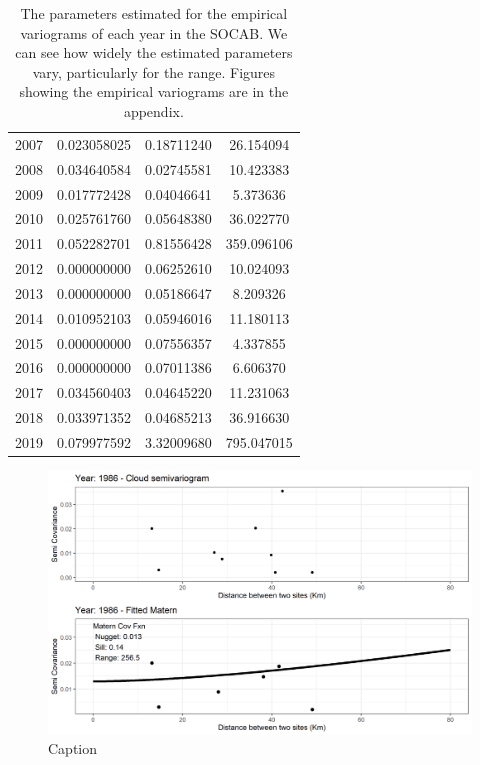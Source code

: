 \begin{table}[]
\begin{tabular}{c|c|c|c}
 2007 & 0.023058025 & 0.18711240  & 26.154094 \\
 2008 & 0.034640584 & 0.02745581  & 10.423383 \\
 2009 & 0.017772428 & 0.04046641  &  5.373636 \\
 2010 & 0.025761760 & 0.05648380  & 36.022770 \\
 2011 & 0.052282701 & 0.81556428 & 359.096106 \\
 2012 & 0.000000000 & 0.06252610  & 10.024093 \\
 2013 & 0.000000000 & 0.05186647  &  8.209326 \\
 2014 & 0.010952103 & 0.05946016  & 11.180113 \\
 2015 & 0.000000000 & 0.07556357  &  4.337855 \\
 2016 & 0.000000000 & 0.07011386  &  6.606370 \\
 2017 & 0.034560403 & 0.04645220  & 11.231063 \\
 2018 & 0.033971352 & 0.04685213  & 36.916630 \\
 2019 & 0.079977592 & 3.32009680 & 795.047015 \\
\end{tabular}
    \caption{The parameters estimated for the empirical variograms of each year in the SOCAB. We can see how widely the estimated parameters vary, particularly for the range. Figures showing the empirical variograms are in the appendix.}
    \label{tab:Emperical_Variogram_Parameter}
\end{table}


\begin{figure}
    \centering
    \includegraphics{Figures/EmpiricalVariograms/Empirical_Variogram_1986.png}
    \caption{Caption}
    \label{fig:my_label}
\end{figure}

